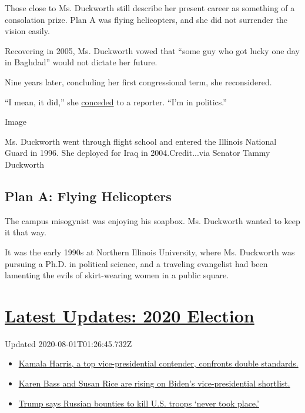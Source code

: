 Those close to Ms. Duckworth still describe her present career as
something of a consolation prize. Plan A was flying helicopters, and she
did not surrender the vision easily.

Recovering in 2005, Ms. Duckworth vowed that ``some guy who got lucky
one day in Baghdad'' would not dictate her future.

Nine years later, concluding her first congressional term, she
reconsidered.

``I mean, it did,'' she
\href{https://www.dailyherald.com/article/20141111/news/141119763}{conceded}
to a reporter. ``I'm in politics.''

Image

Ms. Duckworth went through flight school and entered the Illinois
National Guard in 1996. She deployed for Iraq in 2004.Credit...via
Senator Tammy Duckworth

\hypertarget{plan-a-flying-helicopters}{%
\subsection{Plan A: Flying
Helicopters}\label{plan-a-flying-helicopters}}

The campus misogynist was enjoying his soapbox. Ms. Duckworth wanted to
keep it that way.

It was the early 1990s at Northern Illinois University, where Ms.
Duckworth was pursuing a Ph.D. in political science, and a traveling
evangelist had been lamenting the evils of skirt-wearing women in a
public square.

\hypertarget{latest-updates-2020-election}{%
\section{\texorpdfstring{\href{https://www.nytimes.com/2020/07/31/us/elections/biden-vs-trump.html?action=click\&pgtype=Article\&state=default\&region=MAIN_CONTENT_1\&context=storylines_live_updates}{Latest
Updates: 2020
Election}}{Latest Updates: 2020 Election}}\label{latest-updates-2020-election}}

Updated 2020-08-01T01:26:45.732Z

\begin{itemize}
\tightlist
\item
  \href{https://www.nytimes.com/2020/07/31/us/elections/biden-vs-trump.html?action=click\&pgtype=Article\&state=default\&region=MAIN_CONTENT_1\&context=storylines_live_updates\#link-29fdff45}{Kamala
  Harris, a top vice-presidential contender, confronts double
  standards.}
\item
  \href{https://www.nytimes.com/2020/07/31/us/elections/biden-vs-trump.html?action=click\&pgtype=Article\&state=default\&region=MAIN_CONTENT_1\&context=storylines_live_updates\#link-13ec3d9c}{Karen
  Bass and Susan Rice are rising on Biden's vice-presidential
  shortlist.}
\item
  \href{https://www.nytimes.com/2020/07/31/us/elections/biden-vs-trump.html?action=click\&pgtype=Article\&state=default\&region=MAIN_CONTENT_1\&context=storylines_live_updates\#link-49e9a016}{Trump
  says Russian bounties to kill U.S. troops `never took place.'}
\end{itemize}

